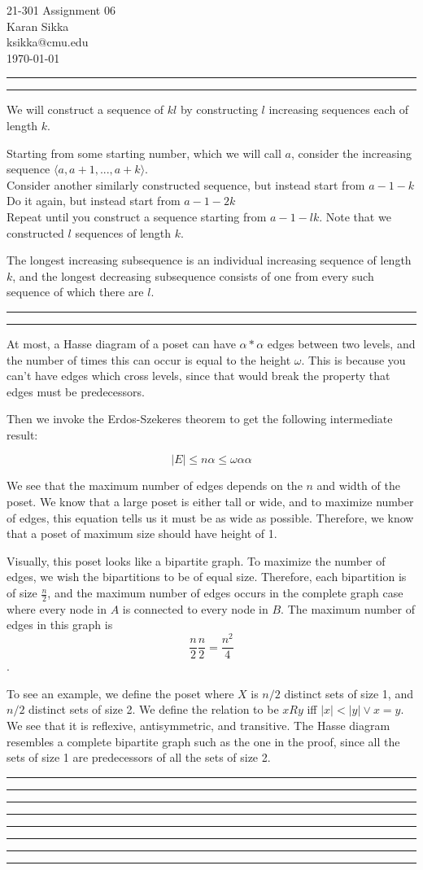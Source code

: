 \documentclass[11pt,letterpaper]{article}
\makeatletter
\newcommand{\question}[1] {\vspace{.25in} \hrule\vspace{0.5em}
\noindent{\bf #1} \vspace{0.5em}
\hrule \vspace{.10in}}
\newcommand{\myname}{Karan Sikka}
\newcommand{\myandrew}{ksikka@cmu.edu}
\newcommand{\myhwnum}{06}
\makeatother
\begin{document}
\medskip

\thispagestyle{plain}
\begin{center}                  %
{\Large 21-301 Assignment \myhwnum} \\
\myname \\
\myandrew \\
\today
\end{center}

\question{1}
We will construct a sequence of $kl$ by constructing $l$ increasing sequences each of length $k$.

Starting from some starting number, which we will call $a$, consider the increasing sequence $\langle a, a+1, ... , a + k \rangle$.\\
Consider another similarly constructed sequence, but instead start from $a - 1 - k $\\
Do it again, but instead start from $a - 1 - 2k $\\
Repeat until you construct a sequence starting from $a - 1 - lk $. Note that we constructed $l$ sequences of length $k$.

The longest increasing subsequence is an individual increasing sequence of length $k$,
and the longest decreasing subsequence consists of one from every such sequence of which there are $l$.


\question{2}
At most, a Hasse diagram of a poset can have $\alpha * \alpha$ edges between two levels,
and the number of times this can occur is equal to the height $\omega$. This is because
you can't have edges which cross levels, since that would break the property that edges must be predecessors.

Then we invoke the Erdos-Szekeres theorem to get the following intermediate result:

$$ |E| \leq n \alpha \leq \omega \alpha \alpha$$

We see that the maximum number of edges depends on the $n$ and width of the poset.
We know that a large poset is either tall or wide, and to maximize number of edges, this equation tells us it must be as wide as possible.
Therefore, we know that a poset of maximum size should have height of 1.

Visually, this poset looks like a bipartite graph. To maximize the number of edges, we wish the bipartitions to be of equal size.
Therefore, each bipartition is of size $\frac{n}{2}$, and the maximum number of edges occurs in the complete graph case where every node
in $A$ is connected to every node in $B$. The maximum number of edges in this graph is $$\frac{n}{2} \frac{n}{2} = \frac{n^2}{4}$$.

To see an example, we define the poset where $X$ is $n/2$ distinct sets of size 1, and $n/2$ distinct sets of size 2.
We define the relation to be $xRy$ iff $|x| < |y| \vee x = y$. We see that it is reflexive, antisymmetric, and transitive.
The Hasse diagram resembles a complete bipartite graph such as the one in the proof,
since all the sets of size 1 are predecessors of all the sets of size 2.

\question{3}

\question{4}

\question{5}

\question{6}
\end{document}
